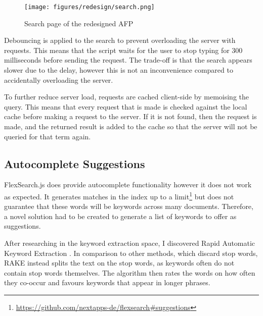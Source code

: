 \documentclass[bsc,frontabs,oneside,singlespacing,parskip,deptreport,logo]{infthesis}
\begin{document}
\begin{figure}[h]
    \centering
    \texttt{[image: figures/redesign/search.png]}
    \caption{Search page of the redesigned AFP}
    \label{fig:search-redesign}
\end{figure}

Debouncing is applied to the search to prevent overloading the server with requests. This means that the script waits for the user to stop typing for 300 milliseconds before sending the request. The trade-off is that the search appears slower \cbstart due to the delay, \cbend however this is not an inconvenience compared to accidentally overloading the server.

\cbstart
To further reduce server load, requests are cached client-side by memoising the query. This means that every request that is made is checked against the local cache before making a request to the server. If it is not found, then the request is made, and the returned result is added to the cache so that the server will not be queried for that term again.
\cbend

\subsection{Autocomplete Suggestions} \label{autocomplete}


FlexSearch.js does provide autocomplete functionality however it does not work as expected. It generates matches in the index up to a limit\footnote{\url{https://github.com/nextapps-de/flexsearch\#suggestions}} but does not guarantee that these words will be keywords across many documents. Therefore, a novel solution had to be created to generate a list of keywords to offer as suggestions. 

After researching in the keyword extraction space, I discovered Rapid Automatic Keyword Extraction \cite{RAKE}. In comparison to other methods, which discard stop words, RAKE instead splits the text on the stop words, as keywords often do not contain stop words themselves. The algorithm then rates the words on how often they co-occur and favours keywords that appear in longer phrases.
\end{document}
